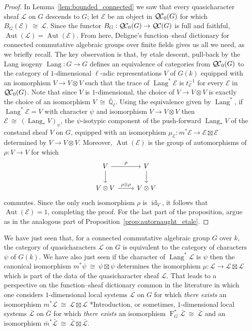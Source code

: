 \documentclass{amsart}
\theoremstyle{plain}
\theoremstyle{definition}
\theoremstyle{remark}
\newcommand{\EE}{\mathbb{\bar Q}_\ell}
\newcommand{\Fq}{k}
\newcommand{\Frob}[1]{\operatorname{F}_{#1}}
\DeclareMathOperator{\Aut}{Aut}
\DeclareMathOperator{\id}{id}
\DeclareMathOperator{\Lang}{Lang}
\newcommand{\iso}{{\ \cong\ }}
\newcommand{\qcs}[1]{{\mathcal{#1}}}
\newcommand{\gqcs}[1]{{\mathcal{\bar #1}}}
\newcommand{\QC}{{\mathcal{Q\hskip-0.8pt C}}}
\newcommand{\bQC}{{\QC_0}}
\newcommand{\trFrob}[1]{t_{#1}}
\newcommand{\bm}{\bar{m}}
\newcommand{\bG}{\bar{G}}
\begin{document}
\begin{proof}
In Lemma~\ref{lem:bounded_connected} we saw that every quasicharacter sheaf $\qcs{L}$ on $G$ descends to $G$; let $\qcs{E}$ be an object in $\bQC(G)$ for which $B_G(\qcs{E}) \iso \qcs{L}$.
 Since the functor $B_G : \bQC(G) \to \QC(G)$ is full and faithful, $\Aut(\qcs{L}) = \Aut(\qcs{E})$.
From here, Deligne's function--sheaf dictionary for connected commutative algebraic groups over finite fields   gives us all we need, as we briefly recall.
The key observation is that, by etale descent, pull-back by the Lang isogeny $\Lang : G\to G$ defines an equivalence of categories from $\bQC(G)$ to the category of $1$-dimensional $\ell$-adic representations $V$ of $G(\Fq)$ equipped with an isomorphism $V \to V\otimes V$ such that the trace of $\Lang^*\qcs{E}$ is $\trFrob{\qcs{E}}^{-1}$ for every $\qcs{E}$ in $\bQC(G)$. 
Note that since $V$ is $1$-dimensional, the choice of $V \to V\otimes V$ is exactly the choice of an isomorphism $V\iso \EE$.
Using the equivalence given by $\Lang^*$, if $\Lang^*\qcs{E} = V$ with character $\psi$ and isomorphism $V\to V\otimes V$ then 
$\qcs{E} \iso (\Lang_* V)_\psi$, the $\psi$-isotypic component of the push-forward $\Lang_* V$ of the constand sheaf $V$ on $G$, equipped with an isomorphism $\mu_\qcs{E} : m^* \qcs{E} \to \qcs{E} \boxtimes\qcs{E}$ determined by $V\to V\otimes V$.
Moreover, $\Aut(\qcs{E})$ is the group of automorphisms of $\rho : V\to V$ for which 
\[
\begin{tikzcd}
\arrow{d}{} V \arrow{r}{\rho} & V\arrow{d}{}\\
V\otimes V \arrow{r}{\rho\otimes \rho} & V\otimes V
\end{tikzcd}
\]
commutes. 
Since the only such isomorphism $\rho$ is $\id_V$, it follows that $\Aut(\qcs{E}) = 1$, completing the proof.
For the last part of the proposition, argue as in the analogous part of Proposition~\ref{prop:autornaught_etale}.
\end{proof}

We have just seen that, for a connected commutative algebraic group $G$ over $\Fq$, the category of quasicharacters $\qcs{L}$ on $G$ is equivalent to the category of characters $\psi$ of $G(\Fq)$.
We have also just seen if the character of $\Lang^*\qcs{L}$ is $\psi$ then the canonical isomorphism $m^*\psi \iso \psi \boxtimes \psi$ determines the isomorphism $\mu : \qcs{L} \to \qcs{L}\boxtimes\qcs{L}$ which is part of the data of the quasicharacter sheaf $\qcs{L}$. That leads to a perspective on the function--sheaf dictionary common in the literature in which one considers $1$-dimensional local systems $\qcs{L}$ on $G$ for which \emph{there exists} an isomorphism $m^*\qcs{L} \iso \qcs{L} \boxtimes\qcs{L}$ \cite{kamgarpour:09a}*{Introduction}, or sometimes, $1$-dimensional local systems $\gqcs{L}$ on $\bG$ for which \emph{there exists} an isomorphism $\Frob{G}^*\gqcs{L} \iso \gqcs{L}$ and an isomorphism $\bm^*\gqcs{L} \iso \gqcs{L} \boxtimes\gqcs{L}$.
\end{document}
